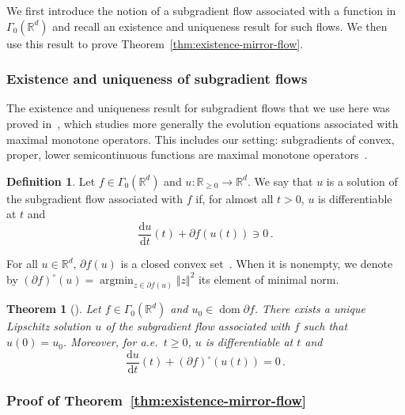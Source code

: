 \documentclass[11pt,english,reqno]{article}
\DeclareMathOperator*{\argmin}{argmin}
\DeclareMathOperator{\dom}{dom}
\newcommand{\diff}{\mathrm{d}}
\newcommand{\R}{\mathbb{R}}
\renewcommand{\geq}{\geqslant}
\theoremstyle{plain}
\newtheorem{thm}[proposition]{Theorem}
\theoremstyle{definition}
\newtheorem{definition}[proposition]{Definition}
\theoremstyle{remark}
\numberwithin{equation}{section}
\begin{document}
We first introduce the notion of a subgradient flow associated with a function in $\Gamma_0(\R^d)$ and recall an existence and uniqueness result for such flows. We then use this result to prove Theorem~\ref{thm:existence-mirror-flow}.

\subsubsection{Existence and uniqueness of subgradient flows}
\label{subsec:existence}

The existence and uniqueness result for subgradient flows that we use here was proved in~\cite{brezis1973ope}, which studies more generally the evolution equations associated with maximal monotone operators. This includes our setting: subgradients of convex, proper, lower semicontinuous functions are maximal monotone operators~\cite[Ex.~2.3.4]{brezis1973ope}.

\begin{definition}
	\label{def:sol-subgradient-flow}
Let $f \in \Gamma_0(\R^d)$ and $u:\R_{\geq 0} \to \R^d$. We say that $u$ is a solution of the subgradient flow associated with $f$ if, for almost all $t > 0$, $u$ is differentiable at $t$ and 
\begin{equation*}
	\frac{\diff u}{\diff t}(t) + \partial f(u(t)) \ni 0 \, .
\end{equation*}
\end{definition}

For all $u \in \R^d$, $\partial f(u)$ is a closed convex set~\cite[p.~28]{brezis1973ope}. When it is nonempty, we denote by $(\partial f)^\circ(u) = \argmin_{z \in \partial f(u)} \Vert z \Vert^2$ its element of minimal norm.

\begin{thm}[{\cite[Thm.~3.1]{brezis1973ope}}]
	\label{thm:brezis}
		Let $f \in \Gamma_0(\R^d)$ and $u_0 \in {\dom \partial f}$. There exists a unique Lipschitz solution $u$ of the subgradient flow associated with $f$ such that $u(0) = u_0$.
	Moreover, for a.e.~$t \geq 0$, $u$ is differentiable at $t$ and
	\begin{equation}
			\label{eq:pointwise-subgradient-flow}
			\frac{\diff u}{\diff t}(t) + (\partial f)^\circ(u(t)) = 0 \, .
		\end{equation}
\end{thm}

\subsubsection{Proof of Theorem~\ref{thm:existence-mirror-flow}}
\label{subsec:proof-existence-mirror-flow}
\end{document}
